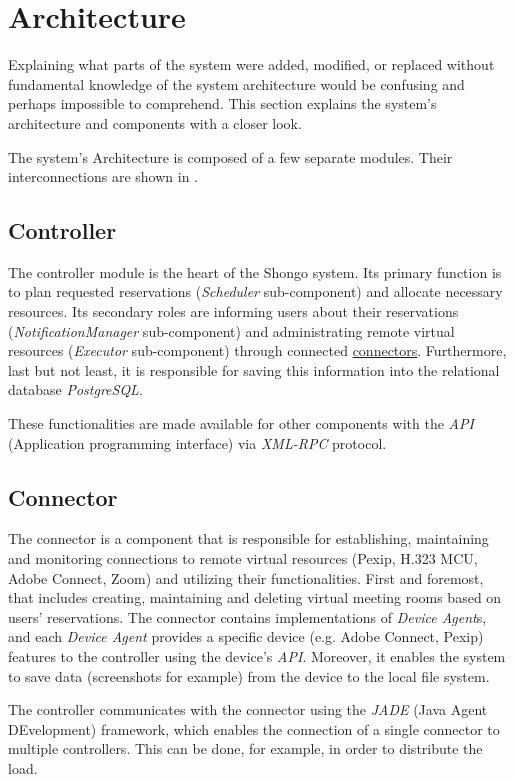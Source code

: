 \section{Architecture}
Explaining what parts of the system were added, modified, or replaced without fundamental knowledge of the system architecture would be confusing and perhaps impossible to comprehend. This section explains the system’s architecture and components with a closer look.

The system's Architecture is composed of a few separate modules. Their interconnections are shown in .

\subsection{Controller} \label{controller}
The controller module is the heart of the Shongo system.
Its primary function is to plan requested reservations (\emph{Scheduler} sub-component) and allocate necessary resources.
Its secondary roles are informing users about their reservations (\emph{NotificationManager} sub-component) and administrating remote virtual resources (\emph{Executor} sub-component) through connected \hyperref[connector]{connectors}.
Furthermore, last but not least, it is responsible for saving this information into the relational database \emph{PostgreSQL}.

These functionalities are made available for other components with the \emph{API} (Application programming interface) via \emph{XML-RPC} protocol.

\subsection{Connector} \label{connector}
The connector is a component that is responsible for establishing, maintaining and monitoring connections to remote virtual resources (Pexip, H.323 MCU, Adobe Connect, Zoom) and utilizing their functionalities. First and foremost, that includes creating, maintaining and deleting virtual meeting rooms based on users' reservations.
The connector contains implementations of \emph{Device Agent}s, and each \emph{Device Agent} provides a specific device (e.g. Adobe Connect, Pexip) features to the controller using the device’s \emph{API}.
Moreover, it enables the system to save data (screenshots for example) from the device to the local file system.

The controller communicates with the connector using the \emph{JADE} (Java Agent DEvelopment) framework, which enables the connection of a single connector to multiple controllers. This can be done, for example, in order to distribute the load.

